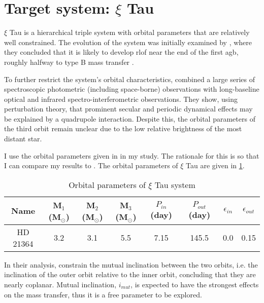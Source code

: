 \section{Target system: $\xi$ Tau}

$\xi$ Tau is a hierarchical triple system with orbital parameters that are relatively well constrained. The evolution of the system was initially examined by \cite{de2014evolution}, where they  concluded that it is likely to develop \ac{rlof} near the end of the first \ac{agb}, roughly halfway to type B mass transfer \citep{kippenhahn1967entwicklung}.

To further restrict the system's orbital characteristics, \cite{nemravova2016xitauri} combined a large series of spectroscopic photometric (including space-borne) observations with long-baseline optical and infrared spectro-interferometric observations. They show, using perturbation theory, that prominent secular and periodic dynamical effects may be explained by a quadrupole interaction. Despite this, the orbital parameters of the third orbit remain unclear due to the low relative brightness of the most distant star.

I use the orbital parameters given in \cite{2010yCat..73890925T} in my study. The rationale for this is so that I can compare my results to \cite{de2014evolution}. The orbital parameters of $\xi$ Tau are given in \cref{tab:system_orbit_param}.
\begin{table}[H]
    \centering
    \begin{tabular}{|c c c c c c c c|}
       Name & M$_1$ (M$_{\odot}$) & M$_2$ (M$_{\odot}$) &
       M$_3$ (M$_{\odot}$) & $P_{in}$ (day) &
       $P_{out}$ (day) & $\epsilon_{in}$ &
       $\epsilon_{out}$ \\
       \hline
       HD 21364 & 3.2 & 3.1 & 5.5 & 7.15 & 145.5 & 0.0 & 0.15
    \end{tabular}
    \caption{ Orbital parameters of $\xi$ Tau system}
    \label{tab:system_orbit_param}
\end{table}
In their analysis, \cite{nemravova2016xitauri} constrain  the mutual inclination between the two orbits, i.e. the inclination of the outer orbit relative to the inner orbit, concluding that they are nearly coplanar. Mutual inclination, $i_{mut}$, is expected to have the strongest effects on the mass transfer, thus it is a free parameter to be explored.
